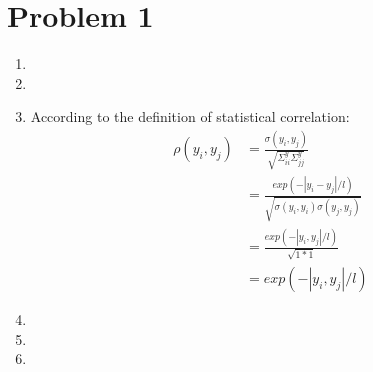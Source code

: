 \documentclass{article}
\begin{document}
\section{Problem 1}
\begin{enumerate}
\item
\item
\item
    According to the definition of statistical correlation:
    \begin{equation}
    \begin{split}
        \rho(y_i, y_j) &= \frac{\sigma(y_i, y_j)}{\sqrt{\Sigma^{y}_{ii}\Sigma^{y}_{jj}}}\\
                       &= \frac{exp(-|y_i - y_j|/l)}{\sqrt{\sigma(y_i, y_i)\sigma(y_j, y_j)}}\\
        &= \frac{exp(-|y_i, y_j|/l)}{\sqrt{1*1}}\\
        &= exp(-|y_i, y_j|/l)
    \end{split}
    \end{equation}
\item
\item
\item
\end{enumerate}
\end{document}
